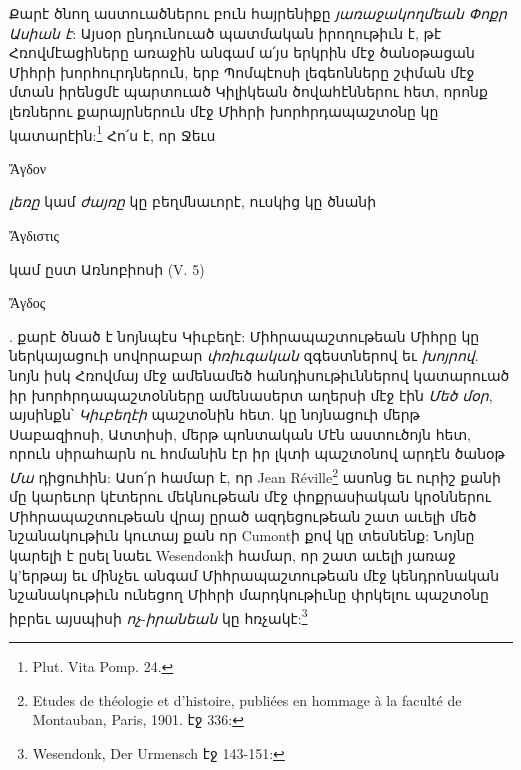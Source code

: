 \documentclass{article}
\begin{document}
{Քարէ ծնող աստուածներու բուն հայրենիքը \emph{յառաջակողմեան Փոքր Ասիան է}: Այսօր ընդունուած պատմական իրողութիւն է, թէ Հռովմէացիները առաջին անգամ ա՛յս երկրին մէջ ծանօթացան Միհրի խորհուրդներուն, երբ Պոմպէոսի լեգեոնները շփման մէջ մտան իրենցմէ պարտուած Կիլիկեան ծովահէններու հետ, որոնք լեռներու քարայրներուն մէջ Միհրի խորհրդապաշտօնը կը կատարէին:\footnote{Plut. Vita Pomp. 24.} Հո՛ս է, որ Ջեւս \begin{greek}Ἄγδον\end{greek} \emph{լեռը} կամ \emph{ժայռը} կը բեղմնաւորէ, ուսկից կը ծնանի \begin{greek}Ἄγδιστις\end{greek} կամ ըստ Առնոբիոսի (V. 5) \begin{greek}Ἄγδος\end{greek}. քարէ ծնած է նոյնպէս Կիւբեղէ: Միհրապաշտութեան Միհրը կը ներկայացուի սովորաբար \emph{փռիւգական} զգեստներով եւ \emph{խոյրով}. նոյն իսկ Հռովմայ մէջ ամենամեծ հանդիսութիւններով կատարուած իր խորհրդապաշտօնները ամենասերտ աղերսի մէջ էին \emph{Մեծ մօր}, այսինքն՝ \emph{Կիւբեղէի} պաշտօնին հետ. կը նոյնացուի մերթ Սաբազիոսի, Ատտիսի, մերթ պոնտական Մէն աստուծոյն հետ, որուն սիրահարն ու հոմանին էր իր լկտի պաշտօնով արդէն ծանօթ \emph{Մա} դիցուհին: Ասո՛ր համար է, որ Jean Réville\footnote{Etudes de théologie et d'histoire, publiées en hommage à la faculté de Montauban, Paris, 1901. էջ 336:} ասոնց եւ ուրիշ քանի մը կարեւոր կէտերու մեկնութեան մէջ փոքրասիական կրօններու Միհրապաշտութեան վրայ ըրած ազդեցութեան շատ աւելի մեծ նշանակութիւն կուտայ քան որ Cumontի քով կը տեսնենք: Նոյնը կարելի է ըսել նաեւ Wesendonkի համար, որ շատ աւելի յառաջ կ'երթայ եւ մինչեւ անգամ Միհրապաշտութեան մէջ կենդրոնական նշանակութիւն ունեցող Միհրի մարդկութիւնը փրկելու պաշտօնը իբրեւ այսպիսի \emph{ոչ}-\emph{իրանեան} կը հռչակէ:\footnote{Wesendonk, Der Urmensch էջ 143-151:}

}
\end{document}
